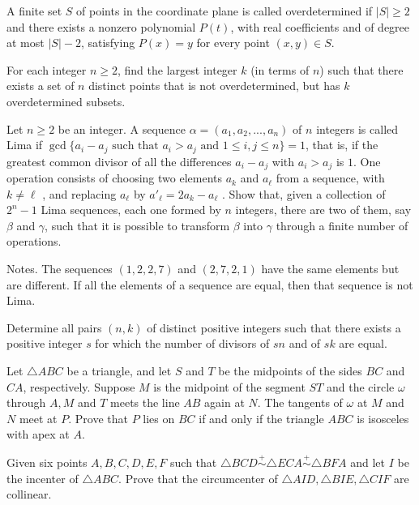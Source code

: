 \documentclass[11pt]{scrartcl}
\begin{document}
\begin{problem}[244533208775214844]
A finite set $S$ of points in the coordinate plane is called overdetermined if $|S|\ge 2$ and there exists a nonzero polynomial $P(t)$, with real coefficients and of degree at most $|S|-2$, satisfying $P(x)=y$ for every point $(x,y)\in S$.

For each integer $n\ge 2$, find the largest integer $k$ (in terms of $n$) such that there exists a set of $n$ distinct points that is not overdetermined, but has $k$ overdetermined subsets.
\end{problem}
\begin{problem}[4514183051583887150]
Let $n\ge 2$ be an integer. A sequence $\alpha = (a_1, a_2,..., a_n)$ of $n$ integers is called Lima if $\gcd \{a_i - a_j \text{ such that } a_i> a_j \text{ and } 1\le i, j\le n\} = 1$, that is, if the greatest common divisor of all the differences $a_i - a_j$ with $a_i> a_j$ is $1$. One operation consists of choosing two elements $a_k$ and $a_{\ell}$ from a sequence, with $k\ne \ell $ , and replacing $a_{\ell}$ by $a'_{\ell}  = 2a_k - a_{\ell}$ .
Show that, given a collection of $2^n - 1$ Lima sequences, each one formed by $n$ integers, there are two of them, say $\beta$ and $\gamma$, such that it is possible to transform $\beta$ into $\gamma$ through a finite number of operations.

Notes.
The sequences $(1,2,2,7)$ and $(2,7,2,1)$ have the same elements but are different.
If all the elements of a sequence are equal, then that sequence is not Lima.
\end{problem}
\begin{problem}[569685816807741]
Determine all pairs $(n, k)$ of distinct positive integers such that there exists a positive integer $s$ for which the number of divisors of $sn$ and of $sk$ are equal.
\end{problem}
\begin{problem}[8639636622304457736]
Let $\triangle ABC$ be a triangle, and let $S$ and $T$ be the midpoints of the sides $BC$ and $CA$, respectively. Suppose $M$ is the midpoint of the segment $ST$ and the circle $\omega$ through $A, M$ and $T$ meets the line $AB$ again at $N$. The tangents of $\omega$ at $M$ and $N$ meet at $P$. Prove that $P$ lies on $BC$ if and only if the triangle $ABC$ is isosceles with apex at $A$.
\end{problem}
\begin{problem}[902621191535073]
Given six points $ A, B, C, D, E, F $ such that $ \triangle BCD \stackrel{+}{\sim} \triangle ECA \stackrel{+}{\sim} \triangle BFA $ and let $ I $ be the incenter of $ \triangle ABC. $ Prove that the circumcenter of $ \triangle AID, \triangle BIE, \triangle CIF $ are collinear.
\end{problem}
\end{document}
